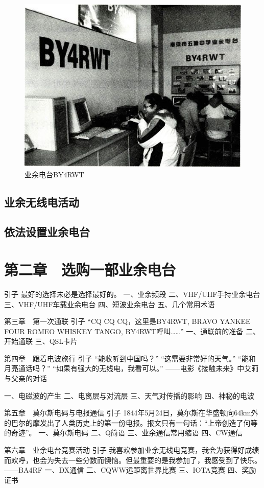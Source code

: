 \documentclass[12pt,UTF8]{ctexbook}
\begin{document}
\begin{figure}[htbp]
	\centering
	\includegraphics[width=0.7\linewidth]{2}
	\caption{业余电台BY4RWT}
	\label{fig:1}
\end{figure}

\section{业余无线电活动}

\section{依法设置业余电台}

\chapter{第二章　选购一部业余电台}
引子
最好的选择未必是选择最好的。
一、业余频段
二、VHF/UHF手持业余电台
三、VHF/UHF车载业余电台
四、短波业余电台
五、几个常用术语

第三章　第一次通联
引子
“CQ CQ CQ，这里是BY4RWT, BRAVO YANKEE FOUR ROMEO WHISKEY TANGO, BY4RWT呼叫……”
一、通联前的准备
二、开始通联
三、QSL卡片

第四章　跟着电波旅行
引子
“能收听到中国吗？”
“这需要非常好的天气。”
“能和月亮通话吗？”
“如果有强大的无线电，我看可以。”
——电影《接触未来》中艾莉与父亲的对话

一、电磁波的产生
二、电离层与对流层
三、天气对传播的影响
四、神秘的电波

第五章　莫尔斯电码与电报通信
引子
1844年5月24日，莫尔斯在华盛顿向64km外的巴尔的摩发出了人类历史上的第一份电报。报文只有一句话：“上帝创造了何等的奇迹”。
一、莫尔斯电码
二、Q简语
三、业余通信常用缩语
四、CW通信

第六章　业余电台竞赛活动
引子
我喜欢参加业余无线电竞赛，我会为获得好成绩而欢呼，也会为失去一些分数而懊恼。但最重要的是我参加了，我感受到了快乐。
——BA4RF
一、DX通信
二、CQWW远距离世界比赛
三、IOTA竞赛
四、奖励证书
\end{document}
